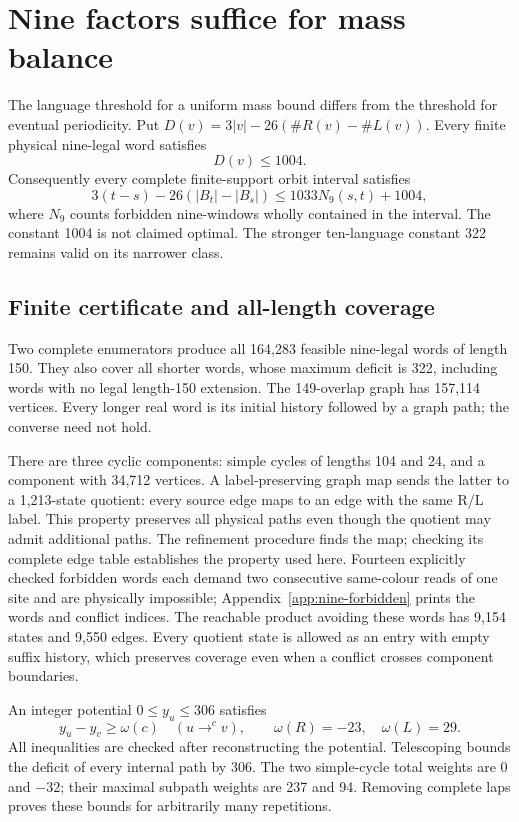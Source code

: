 \section{Nine factors suffice for mass balance}\label{sec:nine-mass}
The language threshold for a uniform mass bound differs from the threshold
for eventual periodicity. Put
$D(v)=3|v|-26(\#R(v)-\#L(v))$. Every finite physical nine-legal word satisfies
\[
 D(v)\le1004.
\]
Consequently every complete finite-support orbit interval satisfies
\[
 3(t-s)-26(|B_t|-|B_s|)\le1033N_9(s,t)+1004,
\]
where $N_9$ counts forbidden nine-windows wholly contained in the interval.
The constant 1004 is not claimed optimal. The stronger ten-language
constant 322 remains valid on its narrower class.

\subsection{Finite certificate and all-length coverage}
Two complete enumerators produce all 164,283 feasible nine-legal words of
length 150. They also cover all shorter words, whose maximum deficit is
322, including words with no legal length-150 extension. The 149-overlap
graph has 157,114 vertices. Every longer real word is its initial history
followed by a graph path; the converse need not hold.

There are three cyclic components: simple cycles of lengths 104 and 24,
and a component with 34,712 vertices. A label-preserving graph map sends
the latter to a 1,213-state quotient: every source edge maps to an edge with
the same R/L label. This property preserves all physical paths even though
the quotient may admit additional paths. The refinement procedure finds the
map; checking its complete edge table establishes the property used here. Fourteen explicitly checked forbidden words each demand two
consecutive same-colour reads of one site and are physically impossible;
Appendix~\ref{app:nine-forbidden} prints the words and conflict indices.
The reachable product avoiding these words has 9,154 states and 9,550 edges.
Every quotient state is allowed as an entry with empty suffix history,
which preserves coverage even when a conflict crosses component boundaries.

An integer potential $0\le y_u\le306$ satisfies
\[
 y_u-y_v\ge\omega(c)\quad(u\mathrel{\mathop{\longrightarrow}^{c}}v),
 \qquad \omega(R)=-23,\quad\omega(L)=29.
\]
All inequalities are checked after reconstructing the potential.
Telescoping bounds the deficit of every internal path by 306.
The two simple-cycle total weights are 0 and $-32$; their maximal
subpath weights are 237 and 94. Removing complete laps proves these
bounds for arbitrarily many repetitions.

